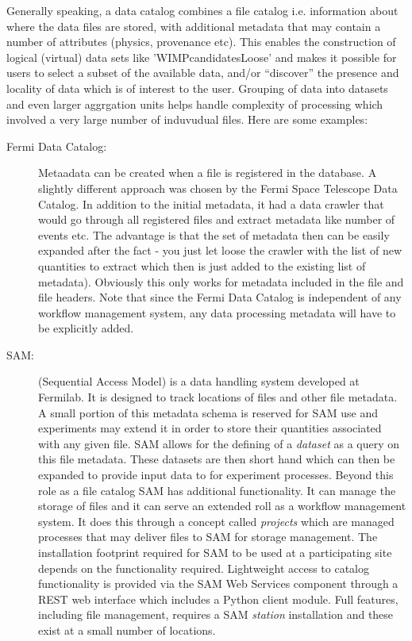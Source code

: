 Generally speaking, a data catalog combines a file catalog i.e. information about where the data files are stored,
with additional metadata that may contain a number of attributes (physics, provenance etc). This enables the construction of logical (virtual)
data sets like 'WIMPcandidatesLoose' and makes it possible for users to select a subset of the available data, and/or ``discover'' the presence and locality of data which
is of interest to the user.
Grouping of data into datasets and even larger aggrgation units helps handle complexity of processing which involved a very large number of induvudual files.
Here are some examples:

\begin{description}
\item[Fermi Data Catalog:] Metaadata can be created when a file is registered in the database. A slightly
different approach was chosen by the Fermi Space Telescope Data Catalog. In addition to the initial metadata, it had a
data crawler that would go through all registered files and extract metadata like number of events etc. The advantage is
that the set of metadata then can be easily expanded after the fact - you just let loose the crawler with the list
of new quantities to extract which then is just added to the existing list of metadata). Obviously this only works for 
metadata included in the file and file headers.  Note that since the Fermi Data Catalog is independent of any
workflow management system, any data processing metadata will have to be explicitly added. 


\item[SAM:] (Sequential Access Model) is a data handling system
  developed at Fermilab.  It is designed to track locations of files
  and other file metadata.  A small portion of this metadata schema is
  reserved for SAM use and experiments may extend it in order to store
  their quantities associated with any given file.  SAM allows for the
  defining of a \textit{dataset} as a query on this file metadata.
  These datasets are then short hand which can then be expanded to
  provide input data to for experiment processes.  Beyond this role as
  a file catalog SAM has additional functionality.  It can manage the
  storage of files and it can serve an extended roll as a workflow
  management system.  It does this through a concept called
  \textit{projects} which are managed processes that may deliver files
  to SAM for storage management.  The installation footprint required
  for SAM to be used at a participating site depends on the
  functionality required.  Lightweight access to catalog functionality
  is provided via the SAM Web Services component through a REST web
  interface which includes a Python client module.  Full features,
  including file management, requires a SAM \textit{station}
  installation and these exist at a small number of locations.


\end{description}

